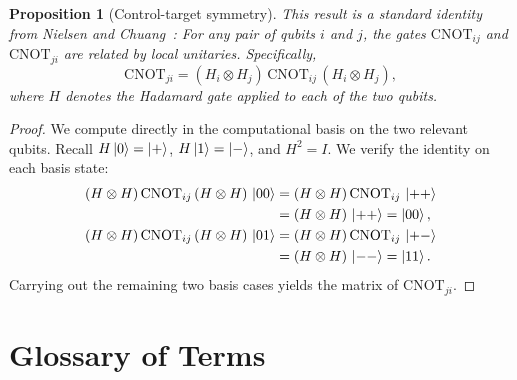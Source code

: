 \documentclass[12pt, a4paper, oneside]{report}
\theoremstyle{plain}
\newtheorem{proposition}[theorem]{Proposition}
\theoremstyle{definition}
\theoremstyle{remark}
\newcommand{\CNOT}{\mathrm{CNOT}}
\begin{document}
\begin{proposition}[Control-target symmetry]
	\label{thm:ctrl-target}
	This result is a standard identity from Nielsen and Chuang~\cite{nielsen2000}: 
	For any pair of qubits $i$ and $j$, the gates $\CNOT_{ij}$ and $\CNOT_{ji}$ are related by
	local unitaries. Specifically,
	\[
		\CNOT_{ji} = (H_i \otimes H_j)\,\CNOT_{ij}\,(H_i \otimes H_j),
	\]
	where $H$ denotes the Hadamard gate applied to each of the two qubits.
\end{proposition}

\begin{proof}
	We compute directly in the computational basis on the two relevant qubits. Recall
	$H\ket{0}=\ket{+}$, $H\ket{1}=\ket{-}$, and $H^2=I$. We verify the identity on each basis
	state:
	\begin{align*}
		(H\otimes H)\,\CNOT_{ij}\,(H\otimes H)\,\ket{00}
		 & = (H\otimes H)\,\CNOT_{ij}\,\ket{++} \\
		 & = (H\otimes H)\,\ket{++} = \ket{00}, \\
		(H\otimes H)\,\CNOT_{ij}\,(H\otimes H)\,\ket{01}
		 & = (H\otimes H)\,\CNOT_{ij}\,\ket{+-} \\
		 & = (H\otimes H)\,\ket{--} = \ket{11}.
	\end{align*}
	Carrying out the remaining two basis cases yields the matrix of $\CNOT_{ji}$. 
\end{proof}



\chapter{Glossary of Terms}
\label{app:glossary}

\newcommand{\gentry}[2]{\noindent\textbf{#1:} #2\medskip\par}
\end{document}
